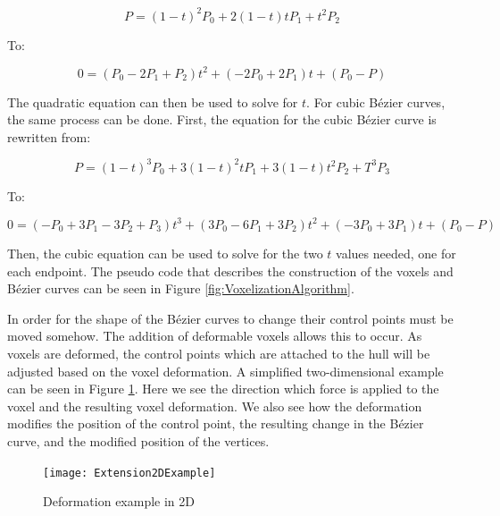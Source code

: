 \[P = (1 - t)^2P_0 + 2(1 - t)tP_1 + t^2 P_2\]

\begin{center}
To:
\end{center}
  
\[0 = (P_0 - 2P_1 + P_2)t^2 + (-2P_0 + 2P_1)t + (P_0 - P)\]

The quadratic equation can then be used to solve for \(t\). For cubic Bézier curves, the same 
process can be done. First, the equation for the cubic Bézier curve is rewritten from:

\[P = (1 - t)^3P_0 + 3(1 - t)^2tP_1 + 3(1 - t)t^2P_2 + T^3P_3\]

\begin{center}
To:
\end{center}

\[0 = (-P_0 + 3P_1 - 3P_2 + P_3)t^3 + (3P_0 - 6P_1 + 3P_2)t^2 + (-3P_0 + 3P_1)t + (P_0 - P)\]

Then, the cubic equation can be used to solve for the two \(t\) values needed, one for each 
endpoint. The pseudo code that describes the construction of the voxels and Bézier curves can be 
seen in Figure \ref{fig:VoxelizationAlgorithm}.

In order for the shape of the Bézier curves to change their control points must be moved somehow.
The addition of deformable voxels allows this to occur. As voxels are deformed, the control points
which are attached to the hull will be adjusted based on the voxel deformation. A simplified 
two-dimensional example can be seen in Figure \ref{fig:Extension2DExample}. Here we see the direction 
which force is 
applied to the voxel and the resulting voxel deformation. We also see how the deformation modifies
the position of the control point, the resulting change in the Bézier curve, and the modified 
position of the vertices.

\begin{figure}[h]
  \centering
  \texttt{[image: Extension2DExample]}
  \caption{Deformation example in 2D}
  \label{fig:Extension2DExample}
\end{figure}


